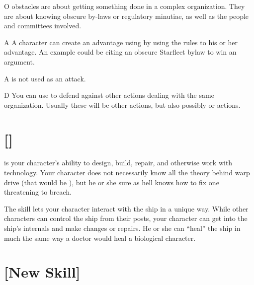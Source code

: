 \documentclass[12pt,titlepage,openany]{book}
\begin{document}
\vspace{1ex}

\begin{NewSkillAction}{O}
     obstacles are about getting something done in a complex
    organization. They are about knowing obscure by-laws or regulatory
    minutiae, as well as the people and committees involved.
\end{NewSkillAction}

\begin{NewSkillAction}{A}
    A character can create an advantage using  by using the
    rules to his or her advantage. An example could be citing an obscure
    Starfleet bylaw to win an argument.
\end{NewSkillAction}

\begin{NewSkillAction}[+]{A}
     is not used as an attack.
\end{NewSkillAction}

\begin{NewSkillAction}{D}
    You can use  to defend against other actions dealing
    with the same organization. Usually these will be other 
    actions, but also possibly  or  actions.
\end{NewSkillAction}

\section{ []}\label{sec:engineering}

 is your character's ability to design, build, repair, and
otherwise work with technology. Your character does not necessarily know all
the theory behind warp drive (that would be ), but he or she
sure as hell knows how to fix one threatening to breach.

The  skill lets your character interact with the ship in a
unique way. While other characters can control the ship from their posts, your
character can get into the ship's internals and make changes or repairs. He or
she can ``heal'' the ship in much the same way a doctor would heal a biological
character.

\section{ [New Skill]}\label{sec:medicine}
\end{document}
